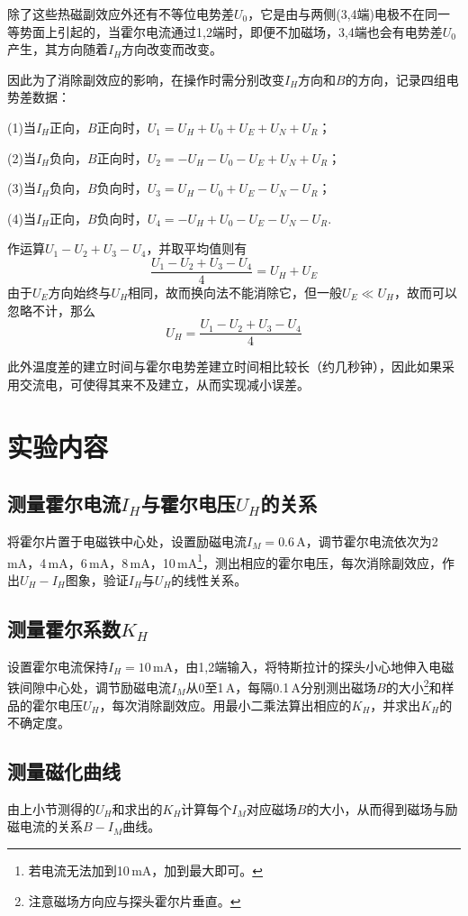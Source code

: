 \documentclass[UTF-8,twoside,cs4size]{ctexart}
\begin{document}
	除了这些热磁副效应外还有不等位电势差$ U_0 $，它是由与两侧(3,4端)电极不在同一等势面上引起的，当霍尔电流通过1,2端时，即便不加磁场，3,4端也会有电势差$ U_0 $产生，其方向随着$ I_H $方向改变而改变。
	
	因此为了消除副效应的影响，在操作时需分别改变$ I_H $方向和$ B $的方向，记录四组电势差数据：
	
	(1)当$ I_H $正向，$ B $正向时，$ U_1=U_H+U_0+U_E+U_N+U_R $；
	
	(2)当$ I_H $负向，$ B $正向时，$ U_2=-U_H-U_0-U_E+U_N+U_R $；
	
	(3)当$ I_H $负向，$ B $负向时，$ U_3=U_H-U_0+U_E-U_N-U_R $；
	
	(4)当$ I_H $正向，$ B $负向时，$ U_4=-U_H+U_0-U_E-U_N-U_R $.
	
	作运算$ U_1-U_2+U_3-U_4 $，并取平均值则有
	\[\frac{U_1-U_2+U_3-U_4}{4}=U_H+U_E\]
	由于$ U_E $方向始终与$ U_H $相同，故而换向法不能消除它，但一般$ U_E\ll U_H $，故而可以忽略不计，那么
	\[U_H=\frac{U_1-U_2+U_3-U_4}{4}\]
	
	此外温度差的建立时间与霍尔电势差建立时间相比较长（约几秒钟），因此如果采用交流电，可使得其来不及建立，从而实现减小误差。
	
	\section{实验内容}
	\subsection{测量霍尔电流$ I_H $与霍尔电压$ U_H $的关系}
	将霍尔片置于电磁铁中心处，设置励磁电流$ I_M=0.6\,\mathrm A $，调节霍尔电流依次为2\,mA，4\,mA，6\,mA，8\,mA，10\,mA\footnote{若电流无法加到10\,mA，加到最大即可。}，测出相应的霍尔电压，每次消除副效应，作出$ U_H-I_H $图象，验证$ I_H $与$ U_H $的线性关系。
	
	\subsection{测量霍尔系数$ K_H $}
	设置霍尔电流保持$ I_H=10\,\mathrm{mA} $，由1,2端输入，将特斯拉计的探头小心地伸入电磁铁间隙中心处，调节励磁电流$ I_M $从$ 0 $至1\,A，每隔0.1\,A分别测出磁场$ B $的大小\footnote{注意磁场方向应与探头霍尔片垂直。}和样品的霍尔电压$ U_H $，每次消除副效应。用最小二乘法算出相应的$ K_H $，并求出$ K_H $的不确定度。
	
	\subsection{测量磁化曲线}
	由上小节测得的$ U_H $和求出的$ K_H $计算每个$ I_M $对应磁场$ B $的大小，从而得到磁场与励磁电流的关系$ B-I_M $曲线。
	
\end{document}
